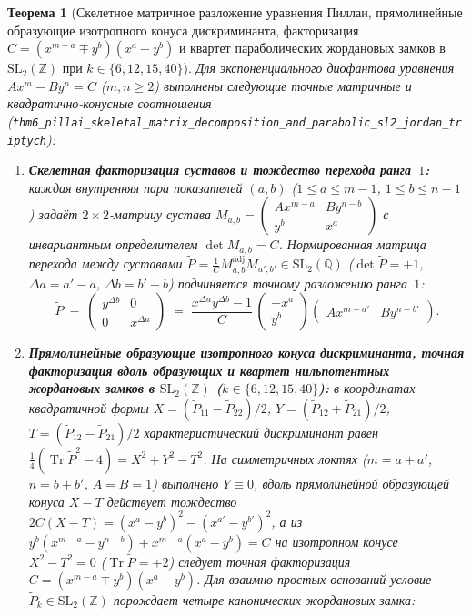 \documentclass[11pt,a4paper]{article}
\theoremstyle{plain}
\newtheorem{theorem}{Теорема}[section]
\theoremstyle{definition}
\begin{document}
\begin{theorem}[Скелетное матричное разложение уравнения Пиллаи, прямолинейные образующие изотропного конуса дискриминанта, факторизация $C = (x^{m-a}\mp y^b)(x^a-y^b)$ и квартет параболических жордановых замков в $\mathrm{SL}_2(\mathbb{Z})$ при $k\in\{6,12,15,40\}$]
\label{thm:main-6}
Для экспоненциального диофантова уравнения $A x^m - B y^n = C$ ($m,n\ge 2$) выполнены следующие точные матричные и квадратично-конусные соотношения (\texttt{thm6\_pillai\_skeletal\_matrix\_decomposition\_and\_parabolic\_sl2\_jordan\_triptych}):
\begin{enumerate}[label=\textbf{(\roman*)},leftmargin=*]
\item \textbf{Скелетная факторизация суставов и тождество перехода ранга~$1$:}
  каждая внутренняя пара показателей $(a,b)$ ($1\le a\le m-1$, $1\le b\le n-1$) задаёт $2\times 2$-матрицу сустава $M_{a,b} = \begin{pmatrix} A x^{m-a} & B y^{n-b} \\ y^b & x^a \end{pmatrix}$ с инвариантным определителем $\det M_{a,b} = C$. Нормированная матрица перехода между суставами $\widetilde{P} = \frac{1}{C} M_{a,b}^{\mathrm{adj}} M_{a',b'}\in\mathrm{SL}_2(\mathbb{Q})$ ($\det\widetilde{P} = +1$, $\Delta a = a'-a$, $\Delta b = b'-b$) подчиняется точному разложению ранга~$1$:
  \[
    \widetilde{P} \;-\; \begin{pmatrix} y^{\Delta b} & 0 \\ 0 & x^{\Delta a} \end{pmatrix}
    \;=\; \frac{x^{\Delta a}y^{\Delta b}-1}{C}\,\begin{pmatrix} -x^a \\ y^b \end{pmatrix}\begin{pmatrix} A x^{m-a'} & B y^{n-b'} \end{pmatrix}.
  \]
\item \textbf{Прямолинейные образующие изотропного конуса дискриминанта, точная факторизация вдоль образующих и квартет нильпотентных жордановых замков в $\mathrm{SL}_2(\mathbb{Z})$ ($k\in\{6,12,15,40\}$):}
  в координатах квадратичной формы $X = (\widetilde{P}_{11}-\widetilde{P}_{22})/2$, $Y = (\widetilde{P}_{12}+\widetilde{P}_{21})/2$, $T = (\widetilde{P}_{12}-\widetilde{P}_{21})/2$ характеристический дискриминант равен $\frac{1}{4}(\operatorname{Tr}\widetilde{P}^2 - 4) = X^2 + Y^2 - T^2$. На симметричных локтях ($m=a+a'$, $n=b+b'$, $A=B=1$) выполнено $Y\equiv 0$, вдоль прямолинейной образующей конуса $X - T$ действует тождество $2C(X - T) = (x^a - y^b)^2 - (x^{a'} - y^{b'})^2$, а из $y^b(x^{m-a}-y^{n-b}) + x^{m-a}(x^a-y^b) = C$ на изотропном конусе $X^2 - T^2 = 0$ ($\operatorname{Tr}\widetilde{P} = \mp 2$) следует точная факторизация $C = (x^{m-a}\mp y^b)(x^a-y^b)$. Для взаимно простых оснований условие $\widetilde{P}_k\in\mathrm{SL}_2(\mathbb{Z})$ порождает четыре канонических жордановых замка:

\end{enumerate}
\end{theorem}
\end{document}
